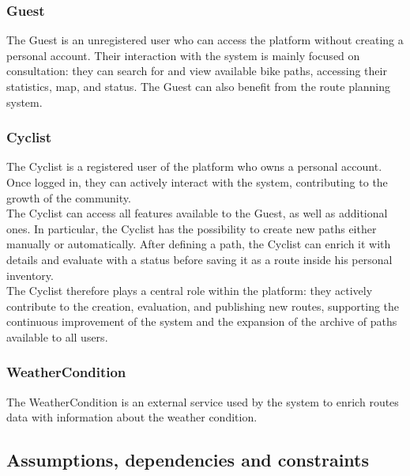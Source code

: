 \subsubsection{Guest}
The Guest is an unregistered user who can access the platform without creating a personal account. Their interaction with the system is mainly focused on consultation: they can search for and view available bike paths, accessing their statistics, map, and status. The Guest can also benefit from the route planning system. 
\subsubsection{Cyclist}
The Cyclist is a registered user of the platform who owns a personal account. Once logged in, they can actively interact with the system, contributing to the growth of the community. \\
The Cyclist can access all features available to the Guest, as well as additional ones. In particular, the Cyclist has the possibility to create new paths either manually or automatically. After defining a path, the Cyclist can enrich it with details and evaluate with a status before saving it as a route inside his personal inventory.\\
The Cyclist therefore plays a central role within the platform: they actively contribute to the creation, evaluation, and publishing new routes, supporting the continuous improvement of the system and the expansion of the archive of paths available to all users.
\subsubsection{WeatherCondition}
The WeatherCondition is an external service used by the system to enrich routes data with information about the weather condition.
\subsection{Assumptions, dependencies and constraints}
